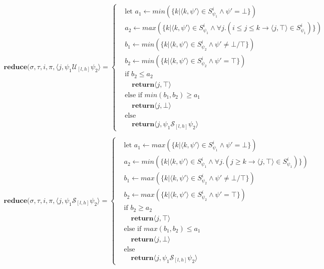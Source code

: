 \documentclass[10pt,a4paper]{article}
\newcommand{\rp}[2]{\ensuremath{\langle #1, #2 \rangle}}
\begin{document}
\begin{align*}
\mathbf{reduce}(\sigma,\tau, i,\pi,\rp{j}{\psi_1 \mathcal{U}_{[l,h]} \psi_2} = \left\{
\begin{aligned}
&\text{let } a_1 \leftarrow min(\{k | \rp{k}{\psi'} \in S^i_{\psi_1} \wedge \psi' = \bot \}) \\
&a_2 \leftarrow max(\{k | \rp{k}{\psi'} \in S^i_{\psi_1} \wedge \forall j. (i \leq j \leq k \rightarrow \rp{j}{\top} \in S^i_{\psi_1}) \}) \\
&b_1 \leftarrow min(\{k | \rp{k}{\psi'} \in S^i_{\psi_2} \wedge \psi' \neq \bot/\top \}) \\
&b_2 \leftarrow min(\{k | \rp{k}{\psi'} \in S^i_{\psi_2} \wedge \psi' = \top \}) \\
&\text{if } b_2 \leq a_2 \\
& \quad\mathbf{return} \rp{j}{\top} \\
&\text{else if } min(b_1,b_2) \geq a_1 \\
& \quad\mathbf{return} \rp{j}{\bot} \\
&\text{else} \\
& \quad\mathbf{return} \rp{j}{\psi_1 \mathcal{S}_{[l,h]} \psi_2}
\end{aligned} \right. \\
\end{align*}
\begin{align*}
\mathbf{reduce}(\sigma,\tau, i,\pi,\rp{j}{\psi_1 \mathcal{S}_{[l,h]} \psi_2} = \left\{
\begin{aligned}
&\text{let } a_1 \leftarrow max(\{k | \rp{k}{\psi'} \in S^i_{\psi_1} \wedge \psi' = \bot \}) \\
&a_2 \leftarrow min(\{k | \rp{k}{\psi'} \in S^i_{\psi_1} \wedge \forall j. (j \geq k \rightarrow \rp{j}{\top} \in S^i_{\psi_1}) \}) \\
&b_1 \leftarrow max(\{k | \rp{k}{\psi'} \in S^i_{\psi_2} \wedge \psi' \neq \bot/\top \}) \\
&b_2 \leftarrow max(\{k | \rp{k}{\psi'} \in S^i_{\psi_2} \wedge \psi' = \top \}) \\
&\text{if } b_2 \geq a_2 \\
& \quad\mathbf{return} \rp{j}{\top} \\
&\text{else if } max(b_1,b_2) \leq a_1 \\
& \quad\mathbf{return} \rp{j}{\bot} \\
&\text{else} \\
& \quad\mathbf{return} \rp{j}{\psi_1 \mathcal{S}_{[l,h]} \psi_2}
\end{aligned} \right. \\
\end{align*}
\end{document}
